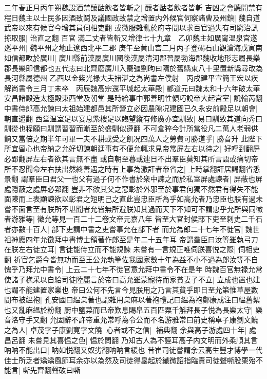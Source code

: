 二年春正月丙午朔魏設酒禁釀酤飲者皆斬之|{
	釀者酤者飲者皆斬}
吉凶之會聽開禁有程日魏主以士民多因酒致鬪及議國政故禁之增置内外候官伺察諸曹及州鎮|{
	魏自道武帝以來有候官今增其員伺相吏翻}
或微服雜亂於府寺間以求百官過失有司窮治訊掠取服|{
	治直之翻}
百官滿二丈者皆斬又增律七十九章　乙卯魏主如廣甯温泉宫遂廵平州|{
	魏平州之地止遼西北平二郡}
庚午至黄山宫二月丙子登碣石山觀滄海戊寅南如信都畋於廣川|{
	廣川縣前漢屬廣川國後漢屬清河郡晉屬勃海郡魏收地形志屬長樂郡長樂即信都也五代志曰北齊廢廣川入棗彊劉昫曰隋於舊縣東八十里置新縣尋改為長河縣屬德州}
乙酉以金紫光禄大夫禇湛之為尚書左僕射　丙戌建平宣簡王宏以疾解尚書令三月丁未卒　丙辰魏高宗還平城起太華殿|{
	酈道元曰魏太和十六年破太華安昌諸殿造太極殿東西堂及朝堂}
是時給事中郭善明性傾巧說帝大起宫室|{
	說輸芮翻}
中書侍郎高允諫曰太祖始建都邑其所營立必因農隙况建國已久永安前殿足以朝會|{
	朝直遥翻}
西堂温室足以宴息紫樓足以臨望縱有修廣亦宜馴致|{
	易曰馴致其道向秀曰馴從也程願曰馴謂習習而漸至於盛馴似遵翻}
不可倉猝今計所當役凡二萬人老弱供餉又當倍之期半年可畢一夫不耕或受之飢况四萬人之勞費可勝道乎|{
	勝音升}
此陛下所宜留心也帝納之允好切諫朝廷事有不便允輒求見帝常屏左右以待之|{
	好呼到翻屏必郢翻屏左右者欲其言無不盡}
或自朝至暮或連日不出羣臣莫知其所言語或痛切帝所不忍聞命左右扶出然終善遇之時有上事為激訐者帝省之|{
	上時掌翻訐居謁翻省悉景翻}
謂羣臣曰君父一也父有過子何不作書於衆中諫之而於私室屏處諫者|{
	屏蔽也屏處隱蔽之處屏必郢翻}
豈非不欲其父之惡彰於外邪至於事君何獨不然君有得失不能面陳而上表顯諫欲以彰君之短明己之直此豈忠臣所為乎如高允者乃忠臣也朕有過未嘗不面言至有朕所不堪聞者允皆無所避朕知其過而天下不知可不謂忠乎允所與同徵者游雅等|{
	徵允等見一百二十二卷文帝元嘉八年}
皆至大官封侯部下吏至刺史二千石者亦數十百人|{
	部下吏謂中書之吏嘗事允在部下者}
而允為郎二十七年不徙官|{
	魏世祖神䴥四年允徵拜中書博士領著作郎至是年二十五年耳}
帝謂羣臣曰汝等雖執弓刀在朕左右徒立耳|{
	言徒能侍立而不能規諫}
未嘗有一言規正唯伺朕喜悦之際|{
	伺相吏翻}
祈官乞爵今皆無功而至王公允執筆佐我國家數十年為益不小不過為郎汝等不自愧乎乃拜允中書令|{
	上云二十七年不徙官意允拜中書令不在是年}
時魏百官無禄允常使諸子樵采以自給司徒陸麗言於帝曰高允雖蒙寵待而家貧妻子不立|{
	立成也置也建也謂不能建置家業也}
帝曰公何不先言今見朕用之乃言其貧乎即日至允第惟草屋數間布被緼袍|{
	孔安國曰緼枲著也謂雜用枲麻以著袍禮記曰緼為袍鄭康成注曰緼舊絮也又亂麻緼於粉翻}
厨中鹽菜而已帝歎息賜帛五百匹粟千斛拜長子悦為長樂太守|{
	樂音洛守手又翻}
允固辭不許帝重允常呼為令公而不名游雅常曰前史稱卓子康劉文饒之為人|{
	卓茂字子康劉寛字文饒}
心者或不之信|{
	補典翻}
余與高子游處四十年|{
	處昌呂翻}
未嘗見其喜愠之色|{
	愠於問翻}
乃知古人為不誣耳高子内文明而外柔順其言呐呐不能出口|{
	呐如悦翻又奴劣翻呐呐言緩也}
昔崔司徒嘗謂余云高生豐才博學一代佳士所乏者矯矯風節耳余亦以為然及司徒得辠起於纎微詔指臨責司徒聲嘶股栗殆不能言|{
	嘶先齊翻聲破曰嘶}

